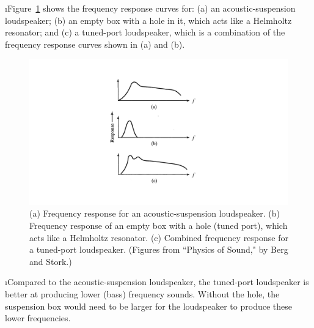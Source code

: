\i Figure~\ref{f:loudspeaker_tunedport_response}
shows the frequency response curves for:
(a) an acoustic-suspension loudspeaker;
(b) an empty box with a hole in it, which acts like a 
Helmholtz resonator; and 
(c) a tuned-port loudspeaker, which is a combination of the 
frequency response curves shown in (a) and (b).
%
\begin{figure}[htbp]
\begin{center}
\includegraphics[height=0.5\textwidth]{loudspeaker_tunedport_response}
\caption{(a) Frequency response for an acoustic-suspension loudspeaker.
(b) Frequency response of an empty box with a hole (tuned port), 
which acts like a Helmholtz resonator.
(c) Combined frequency response for a tuned-port loudspeaker.
(Figures from ``Physics of Sound," by Berg and Stork.)} 
\label{f:loudspeaker_tunedport_response}
\end{center}
\end{figure}
%

\i Compared to the acoustic-suspension loudspeaker, the tuned-port
loudspeaker is better at producing lower (bass) frequency sounds.
Without the hole, the suspension box would need to be larger for 
the loudspeaker to produce these lower frequencies.

\ei
